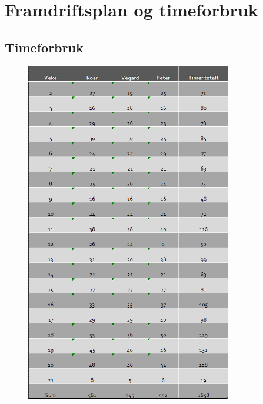 



\thispagestyle{fancy}
\chapter{Framdriftsplan og timeforbruk}

\section{Timeforbruk}
\begin{figure}[htbp]
    \thispagestyle{fancy}
    \centering
    \includegraphics[width=0.8\textwidth]{Vedlegg/TimelisteKort.png}
\end{figure}

\newpage
